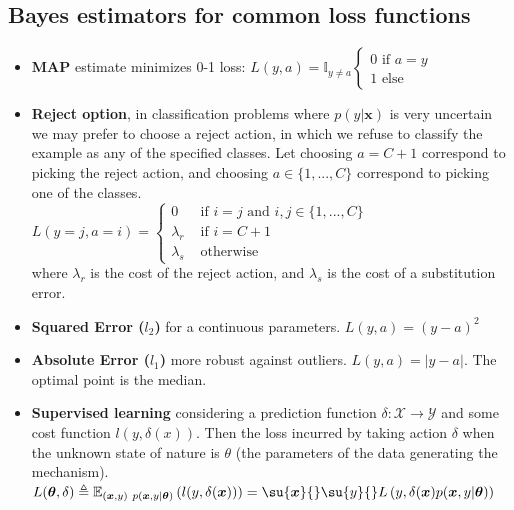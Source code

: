 \subsection{Bayes estimators for common loss functions}
\begin{itemize}
    \item \textbf{MAP} estimate minimizes 0-1 loss: $L(y, a) = \mathbb{I}_{y\neq a}
		\begin{cases}
			0 \text{ if } a = y\\
			1 \text{ else}
		\end{cases}$
    \item \textbf{Reject option}, in classification problems where $p(y|\bm{x})$ is very 
		uncertain we may prefer to choose a reject action, in which we refuse to 
		classify the example as any of the specified classes. Let choosing $a=C+1$
		correspond to picking the reject action, and choosing $a\in\{1,...,C\}$
		correspond to picking one of the classes.\\
		$L(y=j, a=i) = 
		\begin{cases}
			0 &\text{ if } i=j \text{ and } i,j\in\{1,...,C\}\\
			\lambda_{r} &\text{ if } i=C+1 \\
			\lambda_{s} &\text{ otherwise}
		\end{cases} $\\
		where $\lambda_{r}$ is the cost of the reject action, and $\lambda_{s}$ is
		the cost of a substitution error. 
    \item \textbf{Squared Error ($l_{2}$)} for a continuous parameters. $L(y, a) =
        (y-a)^{2}$
    \item \textbf{Absolute Error ($l_{1}$)} more robust against outliers. $L(y,a)=
		\lvert y-a\rvert$. The optimal point is the median.
    \item \textbf{Supervised learning} considering a prediction function $\delta: 
        \mathcal{X} \rightarrow \mathcal{Y}$ and some cost function $l(y, \delta(x))$. 
        Then the loss incurred by taking action $\delta$ when the unknown state of nature
        is $\theta$ (the parameters of the data generating the mechanism).
        $L(\bm{\theta}, \delta) \triangleq 
        \mathbb{E}_{(\bm{x}, y)~p(\bm{x},y|\bm{\theta})}\left(
        l(y, \delta(\bm{x}))\right)=\su{\bm{x}}{}\su{y}{}L\left(y,\delta(\bm{x}) 
        p(\bm{x},y|\bm{\theta})\right)$
\end{itemize}


